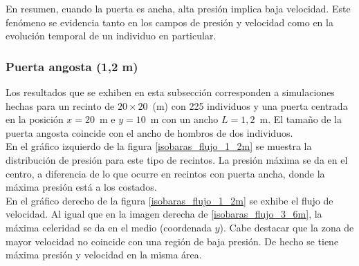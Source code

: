 En resumen, cuando la puerta es ancha, alta presión implica baja velocidad. Este fenómeno se evidencia tanto en los campos de presión y velocidad como en la evolución temporal de un individuo en particular. 

\subsubsection{Puerta angosta (1,2 m)}

Los resultados que se exhiben en esta subsección corresponden a simulaciones hechas para un recinto de  $20\times 20$~(m) con 225 individuos y una puerta centrada en la posición $x=20$~m e $y=10$~m con un ancho $L=1,2$~m. El tamaño de la puerta angosta coincide con el ancho de hombros de dos individuos.\\

En el gráfico izquierdo de la figura \ref{isobaras_flujo_1_2m} se muestra la distribución de presión para este tipo de recintos. La presión máxima se da en el centro, a diferencia de lo que ocurre en recintos con puerta ancha, donde la máxima presión está a los costados.\\

En el gráfico derecho de la figura \ref{isobaras_flujo_1_2m} se exhibe el flujo de velocidad. Al igual que en la imagen derecha de  \ref{isobaras_flujo_3_6m}, la máxima celeridad se da en el medio (coordenada $y$).
Cabe destacar que la zona de mayor velocidad no coincide con una región de baja presión. De hecho se tiene máxima presión y velocidad en la misma área.  

